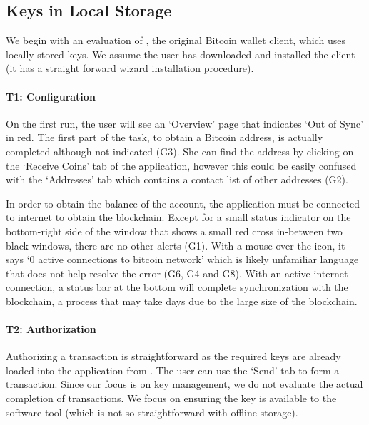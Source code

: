 
\subsection{Keys in Local Storage}

We begin with an evaluation of \bitcoinclient, the original Bitcoin wallet client, which uses locally-stored keys. We assume the user has downloaded and installed the \bitcoinclient client (it has a straight forward wizard installation procedure).

\paragraph{T1: Configuration} 

On the first run, the user will see an `Overview' page that indicates `Out of Sync' in red. The first part of the task, to obtain a Bitcoin address, is actually completed although not indicated (G3). She can find the address by clicking on the `Receive Coins' tab of the application, however this could be easily confused with the `Addresses' tab which contains a contact list of other addresses (G2).

In order to obtain the balance of the account, the application must be connected to internet to obtain the blockchain. Except for a small status indicator on the bottom-right side of the window that shows a small red cross in-between two black windows, there are no other alerts (G1). With a mouse over the icon, it says `0 active connections to bitcoin network' which is likely unfamiliar language that does not help resolve the error (G6, G4 and G8). With an active internet connection, a status bar at the bottom will complete synchronization with the blockchain, a process that may take days due to the large size of the blockchain. 

\paragraph{T2: Authorization} 

Authorizing a transaction is straightforward as the required keys are already loaded into the application from \walletfile. The user can use the `Send' tab to form a transaction. Since our focus is on key management, we do not evaluate the actual completion of transactions. We focus on ensuring the key is available to the software tool (which is not so straightforward with \eg offline storage). 

